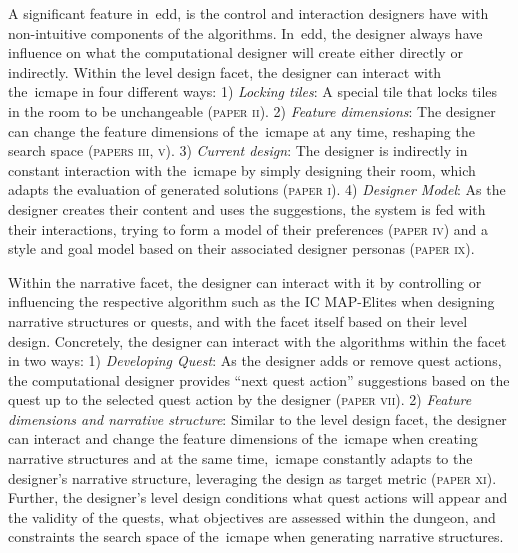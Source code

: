 A significant feature in~\acrshort{edd}, is the control and interaction designers have with non-intuitive components of the algorithms. In~\acrshort{edd}, the designer always have influence on what the computational designer will create either directly or indirectly. Within the level design facet, the designer can interact with the~\acrshort{icmape} in four different ways: 1) \emph{Locking tiles}: A special tile that locks tiles in the room to be unchangeable (\textsc{paper ii}). 2) \emph{Feature dimensions}: The designer can change the feature dimensions of the~\acrshort{icmape} at any time, reshaping the search space (\textsc{papers iii, v}). 3) \emph{Current design}: The designer is indirectly in constant interaction with the~\acrshort{icmape} by simply designing their room, which adapts the evaluation of generated solutions (\textsc{paper i}). 4) \emph{Designer Model}: As the designer creates their content and uses the suggestions, the system is fed with their interactions, trying to form a model of their preferences (\textsc{paper iv}) and a style and goal model based on their associated designer personas (\textsc{paper ix}).

Within the narrative facet, the designer can interact with it by controlling or influencing the respective algorithm such as the IC MAP-Elites when designing narrative structures or quests, and with the facet itself based on their level design. Concretely, the designer can interact with the algorithms within the facet in two ways: 1) \emph{Developing Quest}: As the designer adds or remove quest actions, the computational designer provides ``next quest action'' suggestions based on the quest up to the selected quest action by the designer (\textsc{paper vii}). 2) \emph{Feature dimensions and narrative structure}: Similar to the level design facet, the designer can interact and change the feature dimensions of the~\acrshort{icmape} when creating narrative structures and at the same time,~\acrshort{icmape} constantly adapts to the designer's narrative structure, leveraging the design as target metric (\textsc{paper xi}). Further, the designer's level design conditions what quest actions will appear and the validity of the quests, what objectives are assessed within the dungeon, and constraints the search space of the~\acrshort{icmape} when generating narrative structures.



